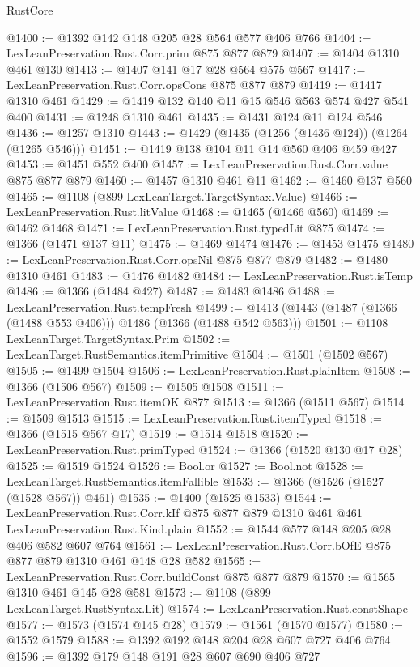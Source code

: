 \begin{lexlean}{RustCore}
\begin{coremodule}
@1400 := @1392 @142 @148 @205 @28 @564 @577 @406 @766
@1404 := LexLeanPreservation.Rust.Corr.prim @875 @877 @879
@1407 := @1404 @1310 @461 @130
@1413 := @1407 @141 @17 @28 @564 @575 @567
@1417 := LexLeanPreservation.Rust.Corr.opsCons @875 @877 @879
@1419 := @1417 @1310 @461
@1429 := @1419 @132 @140 @11 @15 @546 @563 @574 @427 @541 @400
@1431 := @1248 @1310 @461
@1435 := @1431 @124 @11 @124 @546
@1436 := @1257 @1310
@1443 := @1429 (@1435 (@1256 (@1436 @124)) (@1264 (@1265 @546)))
@1451 := @1419 @138 @104 @11 @14 @560 @406 @459 @427
@1453 := @1451 @552 @400
@1457 := LexLeanPreservation.Rust.Corr.value @875 @877 @879
@1460 := @1457 @1310 @461 @11
@1462 := @1460 @137 @560
@1465 := @1108 (@899 LexLeanTarget.TargetSyntax.Value)
@1466 := LexLeanPreservation.Rust.litValue
@1468 := @1465 (@1466 @560)
@1469 := @1462 @1468
@1471 := LexLeanPreservation.Rust.typedLit @875
@1474 := @1366 (@1471 @137 @11)
@1475 := @1469 @1474
@1476 := @1453 @1475
@1480 := LexLeanPreservation.Rust.Corr.opsNil @875 @877 @879
@1482 := @1480 @1310 @461
@1483 := @1476 @1482
@1484 := LexLeanPreservation.Rust.isTemp
@1486 := @1366 (@1484 @427)
@1487 := @1483 @1486
@1488 := LexLeanPreservation.Rust.tempFresh
@1499 := @1413 (@1443 (@1487 (@1366 (@1488 @553 @406))) @1486 (@1366 (@1488 @542 @563)))
@1501 := @1108 LexLeanTarget.TargetSyntax.Prim
@1502 := LexLeanTarget.RustSemantics.itemPrimitive
@1504 := @1501 (@1502 @567)
@1505 := @1499 @1504
@1506 := LexLeanPreservation.Rust.plainItem
@1508 := @1366 (@1506 @567)
@1509 := @1505 @1508
@1511 := LexLeanPreservation.Rust.itemOK @877
@1513 := @1366 (@1511 @567)
@1514 := @1509 @1513
@1515 := LexLeanPreservation.Rust.itemTyped
@1518 := @1366 (@1515 @567 @17)
@1519 := @1514 @1518
@1520 := LexLeanPreservation.Rust.primTyped
@1524 := @1366 (@1520 @130 @17 @28)
@1525 := @1519 @1524
@1526 := Bool.or
@1527 := Bool.not
@1528 := LexLeanTarget.RustSemantics.itemFallible
@1533 := @1366 (@1526 (@1527 (@1528 @567)) @461)
@1535 := @1400 (@1525 @1533)
@1544 := LexLeanPreservation.Rust.Corr.kIf
    @875
    @877
    @879
    @1310
    @461
    @461
    LexLeanPreservation.Rust.Kind.plain
@1552 := @1544 @577 @148 @205 @28 @406 @582 @607 @764
@1561 := LexLeanPreservation.Rust.Corr.bOfE @875 @877 @879 @1310 @461 @148 @28 @582
@1565 := LexLeanPreservation.Rust.Corr.buildConst @875 @877 @879
@1570 := @1565 @1310 @461 @145 @28 @581
@1573 := @1108 (@899 LexLeanTarget.RustSyntax.Lit)
@1574 := LexLeanPreservation.Rust.constShape
@1577 := @1573 (@1574 @145 @28)
@1579 := @1561 (@1570 @1577)
@1580 := @1552 @1579
@1588 := @1392 @192 @148 @204 @28 @607 @727 @406 @764
@1596 := @1392 @179 @148 @191 @28 @607 @690 @406 @727

\end{coremodule}
\end{lexlean}
